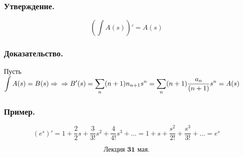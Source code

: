 \documentclass[12pt, letterpaper, twoside]{article}
\newcommand{\DS}{\displaystyle}
\begin{document}
    \subsubsection*{Утверждение.}
    \[\DS \left( \int A(s) \right)' = A(s)\]
    \subsubsection*{Доказательство.}
    Пусть $\DS \int A(s) = B(s)\Rightarrow\\
    \Rightarrow B'(s) = \sum_{n}(n + 1)n_{n + 1} s^n = \sum_{n} (n + 1)\frac{a_n}{(n + 1)} s^n = A(s)$
    \subsubsection*{Пример.}
    \[\left(e^s\right)' = 1 + \frac{2}{2} s + \frac{3}{3!}s^2 + \frac{4}{4!}s^3 + \dots = 1 + s + \frac{s^2}{2!} + \frac{s^3}{3!} + \dots = e^s\]

\[\textbf{Лекция 31 мая.}\]
\end{document}

